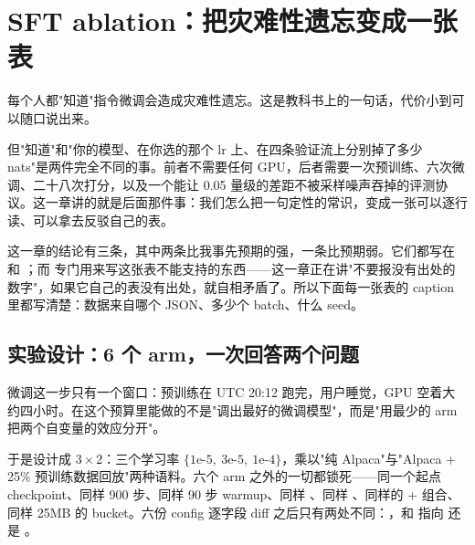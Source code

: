 
\section{SFT ablation：把灾难性遗忘变成一张表}
\label{sec:b-sft}

每个人都"知道"指令微调会造成灾难性遗忘。这是教科书上的一句话，代价小到可以随口说出来。

但"知道"和"你的模型、在你选的那个 lr 上、在四条验证流上分别掉了多少 nats"是两件完全不同的事。前者不需要任何 GPU，后者需要一次预训练、六次微调、二十八次打分，以及一个能让 0.05 量级的差距不被采样噪声吞掉的评测协议。这一章讲的就是后面那件事：我们怎么把一句定性的常识，变成一张可以逐行读、可以拿去反驳自己的表。

这一章的结论有三条，其中两条比我事先预期的强，一条比预期弱。它们都写在  和 ；而  专门用来写这张表不能支持的东西——这一章正在讲"不要报没有出处的数字"，如果它自己的表没有出处，就自相矛盾了。所以下面每一张表的 caption 里都写清楚：数据来自哪个 JSON、多少个 batch、什么 seed。

\subsection{实验设计：6 个 arm，一次回答两个问题}
\label{sec:b-sft-design}

微调这一步只有一个窗口：预训练在 UTC 20:12 跑完，用户睡觉，GPU 空着大约四小时。在这个预算里能做的不是"调出最好的微调模型"，而是"用最少的 arm 把两个自变量的效应分开"。

于是设计成 $3 \times 2$：三个学习率 $\{1\text{e-}5,\ 3\text{e-}5,\ 1\text{e-}4\}$，乘以"纯 Alpaca"与"Alpaca + 25\% 预训练数据回放"两种语料。六个 arm 之外的一切都锁死——同一个起点 checkpoint、同样 900 步、同样 90 步 warmup、同样 、同样 、同样的  +  组合、同样 25MB 的 bucket。六份 config 逐字段 diff 之后只有两处不同：，和  指向  还是 。

